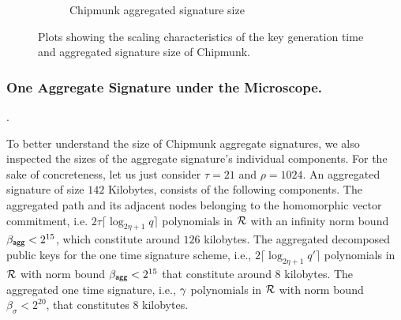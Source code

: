 \begin{figure}[H]
\begin{subfigure}[b]{0.49\textwidth}
  \caption{Chipmunk aggregated signature size}
  \label{fig:sigize}
  \end{subfigure}
  \caption{Plots showing the scaling characteristics of the key generation time and aggregated signature size of Chipmunk.} \label{fig:keygen}
\end{figure}

\subsubsection{One Aggregate Signature under the Microscope.}

\mbox{}.

To better understand the size of Chipmunk aggregate signatures, we also inspected the sizes of the aggregate signature's individual components.
For the sake of concreteness, let us just consider $\tau=21$ and $\rho=1024$.
An aggregated signature of size $142$ Kilobytes, consists of the following components.
The aggregated path and its adjacent nodes belonging to the homomorphic vector commitment, i.e. $2\tau\lceil\log_{2\eta+1}q\rceil$ polynomials in $\mathcal{R}$ with an infinity norm bound $\beta_{\mathsf{agg}} <2^{15}$, which constitute around $126$ kilobytes.
The aggregated decomposed public keys for the one time signature scheme, i.e., $2\lceil\log_{2\eta+1}q'\rceil$ polynomials in $\mathcal{R}$ with norm bound $\beta_{\mathsf{agg}} < 2^{15}$ that constitute around $8$ kilobytes.
The aggregated one time signature, i.e., $\gamma$ polynomials in $\mathcal{R}$ with norm bound $\beta_\sigma < 2^{20}$, that constitutes $8$ kilobytes. 
